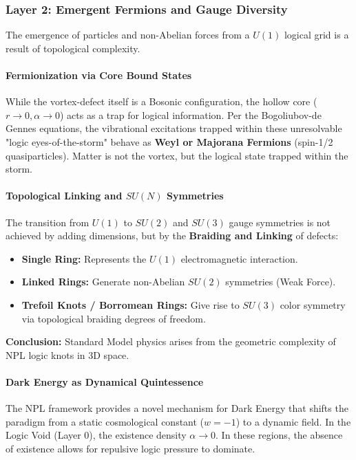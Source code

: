 \documentclass[a4paper,12pt]{article}
\begin{document}
\subsubsection{Layer 2: Emergent Fermions and Gauge Diversity}
The emergence of particles and non-Abelian forces from a $U(1)$ logical grid is a result of topological complexity.

\paragraph{Fermionization via Core Bound States}
While the vortex-defect itself is a Bosonic configuration, the hollow core ($r \to 0, \alpha \to 0$) acts as a trap for logical information. Per the Bogoliubov-de Gennes equations, the vibrational excitations trapped within these unresolvable "logic eyes-of-the-storm" behave as \textbf{Weyl or Majorana Fermions} (spin-1/2 quasiparticles). Matter is not the vortex, but the logical state trapped within the storm.

\paragraph{Topological Linking and $SU(N)$ Symmetries}
The transition from $U(1)$ to $SU(2)$ and $SU(3)$ gauge symmetries is not achieved by adding dimensions, but by the \textbf{Braiding and Linking} of defects:
\begin{itemize}
    \item \textbf{Single Ring:} Represents the $U(1)$ electromagnetic interaction.
    \item \textbf{Linked Rings:} Generate non-Abelian $SU(2)$ symmetries (Weak Force).
    \item \textbf{Trefoil Knots / Borromean Rings:} Give rise to $SU(3)$ color symmetry via topological braiding degrees of freedom.
\end{itemize}
\textbf{Conclusion:} Standard Model physics arises from the geometric complexity of NPL logic knots in 3D space.

\paragraph{Dark Energy as Dynamical Quintessence}
The NPL framework provides a novel mechanism for Dark Energy that shifts the paradigm from a static cosmological constant ($w=-1$) to a dynamic field. In the Logic Void (Layer 0), the existence density $\alpha \to 0$. In these regions, the absence of existence allows for repulsive logic pressure to dominate.
\end{document}
